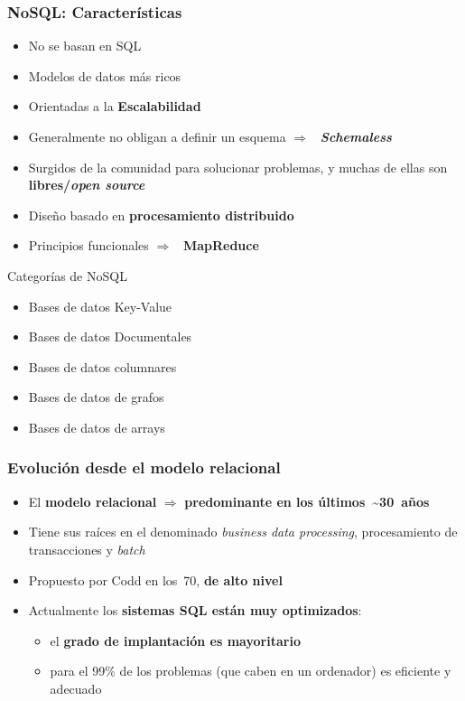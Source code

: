 \documentclass[14pt]{beamer}
\newcommand{\ra}{{\color{blue} $\Rightarrow${}~{}}}
\begin{document}
\begin{frame}[allowframebreaks]
 \frametitle{NoSQL: Características}
\begin{itemize}
\item No se basan en SQL
\item Modelos de datos más ricos
\item Orientadas a la {\bf Escalabilidad}
\item Generalmente no obligan a definir un esquema \ra{}
  {\itshape\bfseries Schemaless}
\item Surgidos de la comunidad para solucionar problemas, y muchas de
  ellas son {\bf libres/{\itshape open source}}
\item Diseño basado en {\bf procesamiento distribuido}
\item Principios funcionales \ra{} {\bf MapReduce}
\end{itemize}

\framebreak

\begin{block}{Categorías de NoSQL}
    \begin{itemize}
    \item Bases de datos Key-Value
    \item Bases de datos Documentales
    \item Bases de datos columnares
    \item Bases de datos de grafos
    \item Bases de datos de arrays
    \end{itemize}
\end{block}
\end{frame}


\begin{frame}
  \frametitle{Evolución desde el modelo relacional}
\begin{itemize}
\item El {\bf modelo relacional} $\Rightarrow$ {\bf predominante en los
  últimos~\~{}30~años}
\item Tiene sus raíces en el denominado {\em business data processing},
  procesamiento de transacciones y {\em batch}
\item Propuesto por Codd en los~70, {\bf de alto nivel}
\item Actualmente los {\bf sistemas SQL están muy optimizados}:
\begin{itemize}
\item el {\bf grado de implantación es mayoritario}
\item para el 99\% de los problemas (que caben en un ordenador) es
  eficiente y adecuado
\end{itemize}
\end{itemize}
\end{frame}
\end{document}
